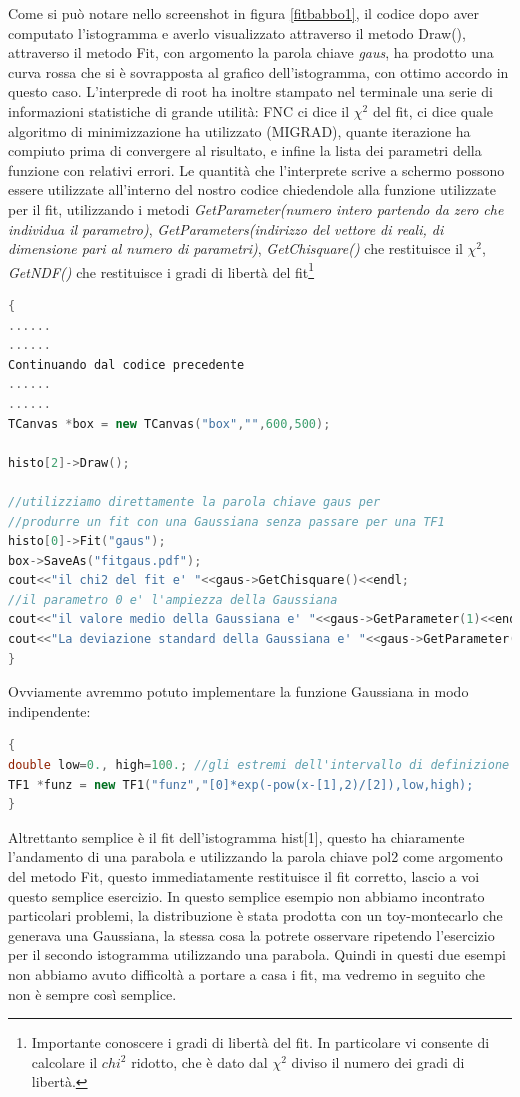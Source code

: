 \documentclass[11pt,fleqn]{book} %
\begin{document}
Come si può notare nello screenshot in figura \ref{fitbabbo1}, il codice dopo aver computato l'istogramma e averlo visualizzato attraverso il metodo Draw(), attraverso il metodo Fit, con argomento la parola chiave \textit{gaus}, ha prodotto una curva rossa che si è sovrapposta al grafico dell'istogramma, con ottimo accordo in questo caso. L'interprede di root ha inoltre stampato nel terminale una serie di informazioni statistiche di grande utilità: FNC ci dice il $\chi^2$ del fit, ci dice quale algoritmo di minimizzazione ha utilizzato (MIGRAD), quante iterazione ha compiuto prima di convergere al risultato, e infine la lista dei parametri della funzione con relativi errori. 
Le quantità che l'interprete scrive a schermo possono essere utilizzate all'interno del nostro codice chiedendole alla funzione utilizzate per il fit, utilizzando i metodi \textit{GetParameter(numero intero partendo da zero che individua il parametro)}, \textit{GetParameters(indirizzo del vettore di reali, di dimensione pari al numero di parametri)}, \textit{GetChisquare()} che restituisce il $\chi^2$, \textit{GetNDF()} che restituisce i gradi di libertà del fit\footnote{Importante conoscere i gradi di libertà del fit. In particolare vi consente di calcolare il $chi^2$ ridotto, che è dato dal $\chi^2$ diviso il numero dei gradi di libertà.}

\begin{lstlisting}[language=c++]
{
......
......
Continuando dal codice precedente
......
......
TCanvas *box = new TCanvas("box","",600,500);

histo[2]->Draw();

//utilizziamo direttamente la parola chiave gaus per 
//produrre un fit con una Gaussiana senza passare per una TF1
histo[0]->Fit("gaus");
box->SaveAs("fitgaus.pdf");
cout<<"il chi2 del fit e' "<<gaus->GetChisquare()<<endl;
//il parametro 0 e' l'ampiezza della Gaussiana
cout<<"il valore medio della Gaussiana e' "<<gaus->GetParameter(1)<<endl;
cout<<"La deviazione standard della Gaussiana e' "<<gaus->GetParameter(2)<<endl;
}
\end{lstlisting}
Ovviamente avremmo potuto implementare la funzione Gaussiana in modo indipendente:
\begin{lstlisting}[language=c++]
{
double low=0., high=100.; //gli estremi dell'intervallo di definizione della funzione
TF1 *funz = new TF1("funz","[0]*exp(-pow(x-[1],2)/[2]),low,high);
}
\end{lstlisting}

Altrettanto semplice è il fit dell'istogramma hist[1], questo ha chiaramente l'andamento di una parabola e utilizzando la parola chiave pol2 come argomento del metodo Fit, questo immediatamente restituisce il fit corretto, lascio a voi questo semplice esercizio.
In questo semplice esempio non abbiamo incontrato particolari problemi, la distribuzione è stata prodotta con un toy-montecarlo che generava una Gaussiana, la stessa cosa la potrete osservare ripetendo l'esercizio per il secondo istogramma utilizzando una parabola. Quindi in questi due esempi non abbiamo avuto difficoltà a portare a casa i fit, ma vedremo in seguito che non è sempre così semplice.
\end{document}
